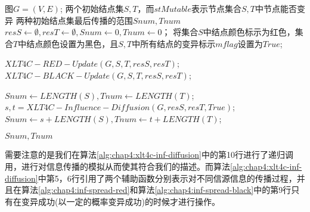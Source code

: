 \begin{algorithm}[H]
	\caption{$XLT4C-Influence-Diffusion(G, S, T, stMutable)$}
	\label{alg:chap4:xlt4c-inf-diffusion}
	\begin{algorithmic}[1]
	\REQUIRE 图$G=(V,E)$; 两个初始结点集$S,T$，而$stMutable$表示节点集合$S,T$中节点能否变异
	\ENSURE 两种初始结点集最后传播的范围$Snum, Tnum$
		\STATE $resS \leftarrow \emptyset, resT \leftarrow \emptyset, Snum \leftarrow 0, Tnum \leftarrow 0$；
			\STATE 将集合$S$中结点颜色标示为红色，集合$T$中结点颜色设置为黑色，且$S,T$中所有结点的变异标示$mflag$设置为$True$;
		\ENDIF

		\STATE $XLT4C-RED-Update(G, S, T, resS, resT)$;
		\STATE $XLT4C-BLACK-Update(G, S, T, resS, resT)$;

			\STATE $Snum \leftarrow LENGTH(S), Tnum \leftarrow LENGTH(T)$;
		\ELSE
			\STATE $s, t = XLT4C-Influence-Diffusion(G, resS, resT, True)$;
			\STATE $Snum \leftarrow s + LENGTH(S), Tnum \leftarrow t + LENGTH(T)$;
		\ENDIF

		\RETURN $Snum, Tnum$
	\end{algorithmic}
\end{algorithm}


需要注意的是我们在算法\ref{alg:chap4:xlt4c-inf-diffusion}中的第10行进行了递归调用，进行对信息传播的模拟从而使其符合我们的描述。而算法\ref{alg:chap4:xlt4c-inf-diffusion}中第5，6行引用了两个辅助函数分别表示对不同信源信息的传播过程，并且在算法\ref{alg:chap4:inf-spread-red}和算法\ref{alg:chap4:inf-spread-black}中的第9行只有在变异成功(以一定的概率变异成功)的时候才进行操作。

